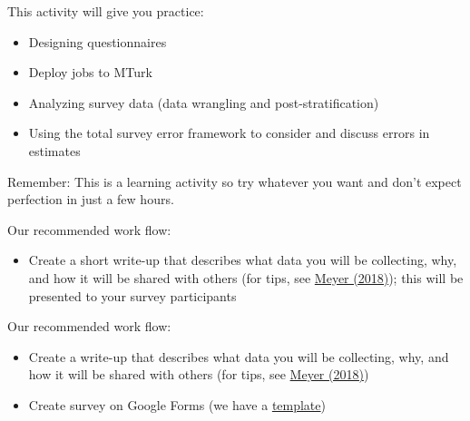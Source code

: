 \documentclass[aspectratio=169]{beamer}
\begin{document}
\begin{frame}

This activity will give you practice:
\begin{itemize}
\item Designing questionnaires
\pause
\item Deploy jobs to MTurk
\pause
\item Analyzing survey data (data wrangling and post-stratification)
\pause
\item Using the total survey error framework to consider and discuss errors in estimates
\end{itemize}

\vfill
Remember: This is a learning activity so try whatever you want and don't expect perfection in just a few hours.

\end{frame}
\begin{frame}

Our recommended work flow:
\begin{itemize}
\item Create a short write-up that describes what data you will be collecting, why, and how it will be shared with others (for tips, see \href{https://doi.org/10.1177/2515245917747656}{Meyer (2018)}); this will be presented to your survey participants
\end{itemize}

\end{frame}
\begin{frame}

Our recommended work flow:
\begin{itemize}
\item Create a write-up that describes what data you will be collecting, why, and how it will be shared with others (for tips, see \href{https://doi.org/10.1177/2515245917747656}{Meyer (2018)})
\item Create survey on Google Forms (we have a \href{https://github.com/compsocialscience/summer-institute/blob/master/2019/materials/day4-surveys/activity/2019-06-13_mturk_google_survey.pdf}{template})
\end{itemize}

\end{frame}
\end{document}
